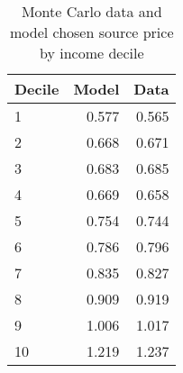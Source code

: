 \begin{table}[!ht]
	\centering
		\caption{Monte Carlo data and model chosen source price by income decile}
\begin{tabular}{lrr}
		\toprule
         Decile&     Model&      Data\\
		\midrule
		              1&     0.577&     0.565\\
		              2&     0.668&     0.671\\
		              3&     0.683&     0.685\\
		              4&     0.669&     0.658\\
		              5&     0.754&     0.744\\
		              6&     0.786&     0.796\\
		              7&     0.835&     0.827\\
		              8&     0.909&     0.919\\
		              9&     1.006&     1.017\\
		             10&     1.219&     1.237\\
		\bottomrule
	\end{tabular}
\end{table}
